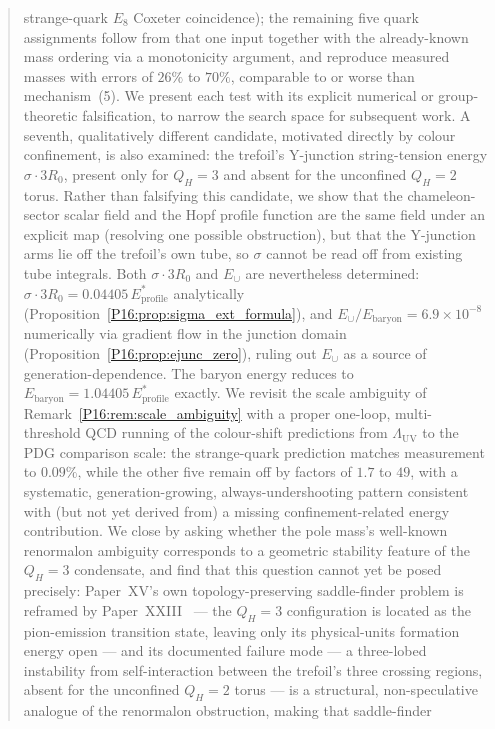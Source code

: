 \documentclass[11pt,a4paper]{article}
\theoremstyle{definition}\newtheorem{definition}[theorem]{Definition}
\theoremstyle{remark}
\theoremstyle{definition}\newtheorem{construction}[theorem]{Construction}
\newcommand{\LUV}{\Lambda_{\mathrm{UV}}}
\newcommand{\QH}{Q_H}
\begin{document}
\begin{abstract}
strange-quark $E_8$ Coxeter coincidence); the remaining five quark
assignments follow from that one input together with the
already-known mass ordering via a monotonicity argument, and reproduce
measured masses with errors of $26\%$ to $70\%$, comparable to or
worse than mechanism~(5). We present each test with its explicit
numerical or group-theoretic falsification, to narrow the search space
for subsequent work. A seventh, qualitatively different candidate,
motivated directly by colour confinement, is also examined: the
trefoil's Y-junction string-tension energy $\sigma\cdot3R_0$, present
only for $\QH=3$ and absent for the unconfined $\QH=2$ torus. Rather
than falsifying this candidate, we show that the chameleon-sector
scalar field and the Hopf profile function are the same field under
an explicit map (resolving one possible obstruction), but that the
Y-junction arms lie off the trefoil's own tube, so $\sigma$ cannot be
read off from existing tube integrals. Both $\sigma\cdot3R_0$ and
$E_\cup$ are nevertheless determined: $\sigma\cdot3R_0 =
0.04405\,E_{\mathrm{profile}}^*$ analytically
(Proposition~\ref{P16:prop:sigma_ext_formula}), and $E_\cup/E_{\mathrm{baryon}}
= 6.9\times10^{-8}$ numerically via gradient flow in the junction domain
(Proposition~\ref{P16:prop:ejunc_zero}), ruling out $E_\cup$ as a source
of generation-dependence. The baryon energy reduces to $E_{\mathrm{baryon}}
= 1.04405\,E_{\mathrm{profile}}^*$ exactly. We revisit
the scale ambiguity of Remark~\ref{P16:rem:scale_ambiguity} with a proper
one-loop, multi-threshold QCD running of the colour-shift predictions
from $\LUV$ to the PDG comparison scale: the strange-quark prediction
matches measurement to $0.09\%$, while the other five remain off by
factors of $1.7$ to $49$, with a systematic, generation-growing,
always-undershooting pattern consistent with (but not yet derived
from) a missing confinement-related energy contribution. We close by
asking whether the pole mass's well-known renormalon ambiguity
corresponds to a geometric stability feature of the $\QH=3$
condensate, and find that this question cannot yet be posed precisely:
Paper~XV's own topology-preserving saddle-finder problem is reframed by
Paper~XXIII~\cite{Paper23} --- the $\QH=3$ configuration is located as the
pion-emission transition state, leaving only its physical-units formation
energy open --- and its documented failure mode --- a three-lobed instability from
self-interaction between the trefoil's three crossing regions, absent
for the unconfined $\QH=2$ torus --- is a structural, non-speculative
analogue of the renormalon obstruction, making that saddle-finder

\end{abstract}
\end{document}
